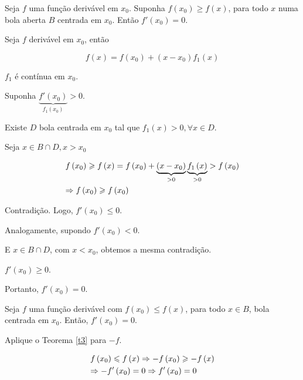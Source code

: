 \documentclass[11pt, oneside, a4paper]{gsm-l}
\begin{document}
\begin{teo}
\label{t3}
Seja $f$ uma função derivável em $x_0$. Suponha $f\left( {x_0 } \right) \geqslant f\left( x \right)$, para todo $x$ numa bola aberta $B$ centrada em $x_0$. Então $f'\left( {x_0 } \right) = 0$.
\end{teo}

\begin{dem}
Seja $f$ derivável em $x_0$, então

\[
    f\left( x \right) = f\left( {x_0 } \right) + \left( {x - x_0 } \right)f_1 \left( x \right)
\]

$f_1$ é contínua em $x_0$.

    Suponha $\underbrace {f'\left( {x_0 } \right)}_{f_1 \left( {x_0 } \right)} > 0$.

    Existe $D$ bola centrada em $x_0$ tal que $f_1 \left( x \right) > 0,\forall x \in D$.

Seja $x \in B \cap D,x > x_0$

\[
\begin{gathered}
      f\left( {x_0 } \right) \geqslant f\left( x \right) = f\left( {x_0 } \right) + \underbrace {\left( {x - x_0 } \right)}_{ > 0}\underbrace {f_1 \left( x \right)}_{ > 0} > f\left( {x_0 } \right) \hfill \\
       \Rightarrow f\left( {x_0 } \right) \geqslant f\left( {x_0 } \right) \hfill \\
\end{gathered}
\]

Contradição. Logo, $f'\left( {x_0 } \right) \leqslant 0$.

Analogamente, supondo $f'\left( {x_0 } \right) < 0$.

E $x \in B \cap D$, com $x < x_0$, obtemos a mesma contradição.

$f'\left( {x_0 } \right) \geqslant 0$.

Portanto, $f'\left( {x_0 } \right) = 0$.
\end{dem}

\begin{teo}
    Seja $f$ uma função derivável com $f\left( {x_0 } \right) \leqslant f\left( x \right)$, para todo $x \in B$, bola centrada em $x_0$. Então, $f'\left( {x_0 } \right) = 0$.
\end{teo}

\begin{dem}
Aplique o Teorema \ref{t3} para $-f$.

\[
\begin{gathered}
  f\left( {x_0 } \right) \leqslant f\left( x \right) \Rightarrow  - f\left( {x_0 } \right) \geqslant  - f\left( x \right) \hfill \\
   \Rightarrow  - f'\left( {x_0 } \right) = 0 \Rightarrow f'\left( {x_0 } \right) = 0 \hfill \\
\end{gathered}
\]

\end{dem}
\end{document}
